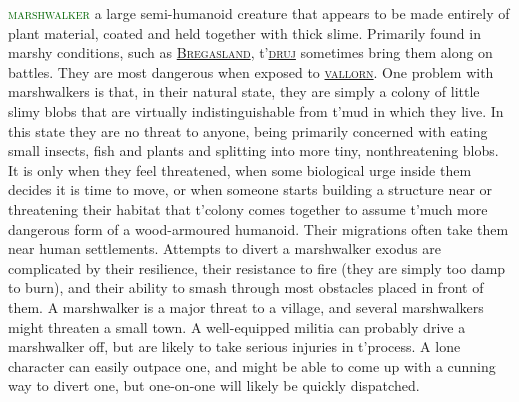 \documentclass[twoside,11pt,b5paper,twocolumn]{scrbook}
\newcommand{\estcab}[1]{\textsc{\textcolor{marron}{#1}}}
\renewcommand{\paragraph}[1]{\par\noindent\markboth{#1}{#1}\estcab{\textcolor{darkgreen}{#1}}\label{#1} }
\newcommand{\see}[1]{{\estcab{\hyperref[#1]{#1}}}}
\begin{document}
\paragraph{marshwalker} a large semi-humanoid creature that appears to be made entirely of plant material, coated and held together with thick slime. Primarily found in marshy conditions, such as \see{Bregasland}, t'\see{druj} sometimes bring them along on battles. They are most dangerous when exposed to \see{vallorn}. One problem with marshwalkers is that, in their natural state, they are simply a colony of little slimy blobs that are virtually indistinguishable from t'mud in which they live. In this state they are no threat to anyone, being primarily concerned with eating small insects, fish and plants and splitting into more tiny, nonthreatening blobs. It is only when they feel threatened, when some biological urge inside them decides it is time to move, or when someone starts building a structure near or threatening their habitat that t'colony comes together to assume t'much more dangerous form of a wood-armoured humanoid. Their migrations often take them near human settlements. Attempts to divert a marshwalker exodus are complicated by their resilience, their resistance to fire (they are simply too damp to burn), and their ability to smash through most obstacles placed in front of them. A marshwalker is a major threat to a village, and several marshwalkers might threaten a small town. A well-equipped militia can probably drive a marshwalker off, but are likely to take serious injuries in t'process. A lone character can easily outpace one, and might be able to come up with a cunning way to divert one, but one-on-one will likely be quickly dispatched. 
\end{document}
